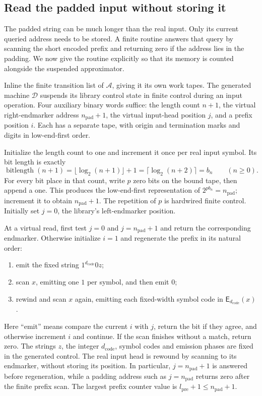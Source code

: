 \documentclass[11pt]{article}
\numberwithin{equation}{section}
\theoremstyle{definition}
\theoremstyle{remark}
\begin{document}
\subsection{Read the padded input without storing it}
\label{subsec:compiler-callback}

The padded string can be much longer than the real input. Only its current queried address needs to be stored. A finite routine answers that query by scanning the short encoded prefix and returning zero if the address lies in the padding. We now give the routine explicitly so that its memory is counted alongside the suspended approximator.

Inline the finite transition list of ${\mathcal{A}}$, giving it its own work tapes.
The generated machine ${\mathcal{D}}$ suspends its library control state in finite
control during an input operation.  Four auxiliary binary words suffice:
the length count $n+1$, the virtual right-endmarker address
${n}_{\mathrm{pad}}+1$, the virtual input-head position ${j}$, and a prefix
position ${i}$.  Each has a separate tape, with origin and termination
marks and digits in low-end-first order.

Initialize the length count to one and increment it once per real input
symbol.  Its bit length is exactly
\begin{equation}\label{eq:compiler-bitlength}
 \operatorname{bitlength}(n+1)
   =\lfloor\log_2(n+1)\rfloor+1
   =\lceil\log_2(n+2)\rceil={b}_n
 \qquad(n\ge0).
\end{equation}
For every bit place in that count, write ${p}$ zero bits on the bound tape,
then append a one.  This produces the low-end-first representation of
$2^{{p}{b}_n}={n}_{\mathrm{pad}}$; increment it to obtain
${n}_{\mathrm{pad}}+1$.  The repetition of ${p}$ is hardwired finite control.
Initially set ${j}=0$, the library's left-endmarker position.

At a virtual read, first test ${j}=0$ and ${j}={n}_{\mathrm{pad}}+1$ and return
the corresponding endmarker.  Otherwise initialize ${i}=1$ and regenerate
the prefix in its natural order:
\begin{enumerate}
 \item emit the fixed string $1^{d_{\mathrm{code}}}0z$;
 \item scan $x$, emitting one $1$ per symbol, and then emit $0$;
 \item rewind and scan $x$ again, emitting each fixed-width symbol code
       in ${\mathsf{E}}_{d_{\mathrm{code}}}(x)$.
\end{enumerate}
Here ``emit'' means compare the current ${i}$ with ${j}$, return the bit
if they agree, and otherwise increment ${i}$ and continue.  If the scan
finishes without a match, return zero.  The strings $z$, the integer
$d_{\mathrm{code}}$, symbol codes and emission phases are fixed in
the generated control.  The real input head is rewound by scanning to
its endmarker, without storing its position.  In particular,
${j}={n}_{\mathrm{pad}}+1$ is answered before regeneration, while a padding
address such as ${j}={n}_{\mathrm{pad}}$ returns zero after the finite
prefix scan.  The largest prefix counter value is
${l}_{\mathrm{pre}}+1\le {n}_{\mathrm{pad}}+1$.
\end{document}
